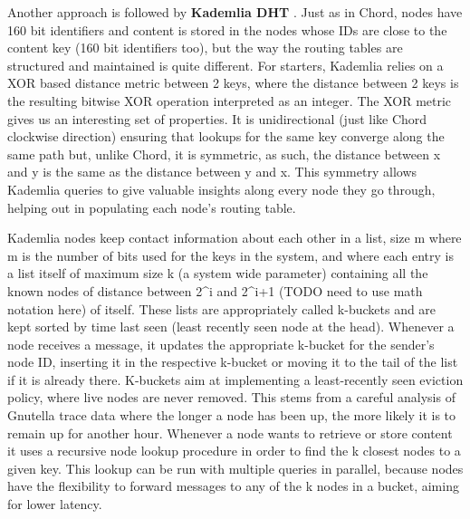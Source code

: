 Another approach is followed by \textbf{Kademlia DHT} \cite{Maymounkov2002}.
Just as in Chord, nodes have 160 bit identifiers and content is
stored in the nodes whose IDs are close to the content key (160 bit
identifiers too), but the way the routing tables are structured and
maintained is quite different. For starters, Kademlia relies on a XOR
based distance metric between 2 keys, where the distance between 2 keys
is the resulting bitwise XOR operation interpreted as an integer. The
XOR metric gives us an interesting set of properties. It is
unidirectional (just like Chord clockwise direction) ensuring that
lookups for the same key converge along the same path but, unlike Chord,
it is symmetric, as such, the distance between x and y is the same as
the distance between y and x. This symmetry allows Kademlia queries to
give valuable insights along every node they go through, helping out in
populating each node's routing table.

Kademlia nodes keep contact information about each other in a list, size
m where m is the number of bits used for the keys in the system, and
where each entry is a list itself of maximum size k (a system wide
parameter) containing all the known nodes of distance between 2\^{}i and
2\^{}i+1 (TODO need to use math notation here) of itself. These lists
are appropriately called k-buckets and are kept sorted by time last seen
(least recently seen node at the head). Whenever a node receives a
message, it updates the appropriate k-bucket for the sender's node ID,
inserting it in the respective k-bucket or moving it to the tail of the
list if it is already there. K-buckets aim at implementing a
least-recently seen eviction policy, where live nodes are never removed.
This stems from a careful analysis of Gnutella trace data \cite{Saroiu2002}
where the longer a node has been up, the more likely
it is to remain up for another hour. Whenever a node wants to retrieve
or store content it uses a recursive node lookup procedure in order to
find the k closest nodes to a given key. This lookup can be run with
multiple queries in parallel, because nodes have the flexibility to
forward messages to any of the k nodes in a bucket, aiming for lower
latency.

